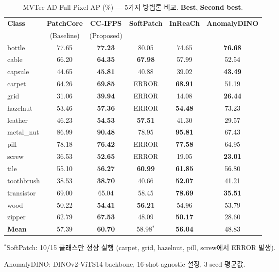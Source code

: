 \documentclass[11pt,a4paper]{article}
\newcommand{\best}[1]{\textcolor{bestcolor}{\textbf{#1}}}
\newcommand{\second}[1]{\textcolor{secondcolor}{\textbf{#1}}}
\begin{document}
\begin{table}[H]
\centering
\caption{MVTec AD Full Pixel AP (\%) — 5가지 방법론 비교. \best{Best}, \second{Second best}.}
\label{tab:full_comparison}
\small
\begin{tabular}{l ccccc}
\toprule
\textbf{Class} & \textbf{PatchCore} & \textbf{CC-IFPS} & \textbf{SoftPatch} & \textbf{InReaCh} & \textbf{AnomalyDINO} \\
 & (Baseline) & (Proposed) & & & \\
\midrule
bottle       & 77.65 & \second{77.23} & 80.05 & 74.65 & \best{76.68} \\
cable        & 66.20 & \second{64.35} & \best{67.98} & 57.99 & 52.54 \\
capsule      & 44.65 & \best{45.81} & 40.88 & 39.02 & \second{43.49} \\
carpet       & 64.26 & \best{69.85} & ERROR & \second{68.91} & 51.19 \\
grid         & 31.06 & \best{39.94} & ERROR & 14.08 & \second{26.44} \\
hazelnut     & 53.46 & \best{57.36} & ERROR & \second{54.48} & 73.23 \\
leather      & 46.23 & \best{54.53} & \second{57.51} & 41.30 & 29.57 \\
metal\_nut   & 86.99 & \best{90.48} & 78.95 & \second{95.81} & 67.43 \\
pill         & 78.18 & \second{76.42} & ERROR & \best{77.58} & 64.95 \\
screw        & 36.53 & \best{52.65} & ERROR & 19.05 & \second{23.01} \\
tile         & 55.10 & \second{56.27} & \best{60.99} & \best{61.85} & 56.80 \\
toothbrush   & 38.53 & \second{38.70} & 40.66 & \best{52.07} & 41.21 \\
transistor   & 69.00 & 65.04 & 58.45 & \best{78.69} & \second{35.51} \\
wood         & 50.22 & \best{54.41} & \second{56.21} & 54.96 & 53.79 \\
zipper       & 62.79 & \best{67.53} & 48.09 & \second{50.17} & 28.60 \\
\midrule
\rowcolor{hlrow}
\textbf{Mean} & 57.39 & \best{60.70} & 58.98$^*$ & \second{56.04} & 48.83 \\
\bottomrule
\end{tabular}
\vspace{2mm}

\small{$^*$SoftPatch: 10/15 클래스만 정상 실행 (carpet, grid, hazelnut, pill, screw에서 ERROR 발생).}

\small{AnomalyDINO: DINOv2-ViTS14 backbone, 16-shot agnostic 설정, 3 seed 평균값.}
\end{table}
\end{document}
